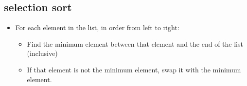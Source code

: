 {{  \subsection*{selection sort}
  \begin{itemize}
    \item For each element in the list, in order from left to right:
      \begin{itemize}
        \item Find the minimum element between that element and the end of the
          list (inclusive)
        \item If that element is not the minimum element, swap it with the
          minimum element.
      \end{itemize}
  \end{itemize}
}}

\textQuestion{\makePageQuadrilleRuled}

\newpage

